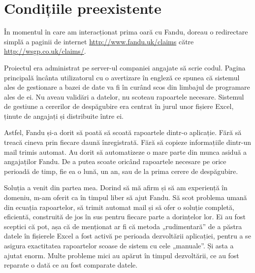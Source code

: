 \section{Condițiile preexistente}
	În momentul în care am interacționat prima oară cu Fandu, doreau o redirectare simplă a paginii de internet
	\url{http://www.fandu.uk/claims}\cite{fandu_uk} către \\
	\url{http://wsgp.co.uk/claims/}\cite{wsgp_claims}. 

	Proiectul era administrat pe server-ul companiei angajate să scrie codul. Pagina principală încânta utilizatorul cu o avertizare în engleză ce spunea că sistemul ales de gestionare a bazei de date va fi în curând scos din limbajul de programare ales de ei. Nu aveau validări a datelor, nu scoteau rapoartele necesare. Sistemul de gestiune a cererilor de despăgubire era centrat în jurul unor fișiere Excel, ținute de angajați și distribuite între ei.

	Astfel, Fandu și-a dorit să poată să scoată rapoartele dintr-o aplicație. Fără să treacă cineva prin fiecare daună înregistrată. Fără să copieze informațiile dintr-un mail trimis automat. Au dorit să automatizeze o mare parte din munca asiduă a angajaților Fandu. De a putea scoate oricând rapoartele necesare pe orice perioadă de timp, fie ea o lună, un an, sau de la prima cerere de despăgubire.

	Soluția a venit din partea mea. Dorind să mă afirm și să am experiență în domeniu, m-am oferit ca în timpul liber să ajut Fandu. Să scot problema umană din ecuația rapoartelor, să trimit automat mail și să ofer o soluție completă, eficientă, construită de jos în sus pentru fiecare parte a dorințelor lor. Ei au fost sceptici că pot, așa că de menționat ar fi că metoda „rudimentară” de a păstra datele în fișierele Excel a fost activă pe perioada dezvoltării aplicației, pentru a se asigura exactitatea rapoartelor scoase de sistem cu cele „manuale”. Și asta a ajutat enorm. Multe probleme mici au apărut în timpul dezvoltării, ce au fost reparate o dată ce au fost comparate datele.